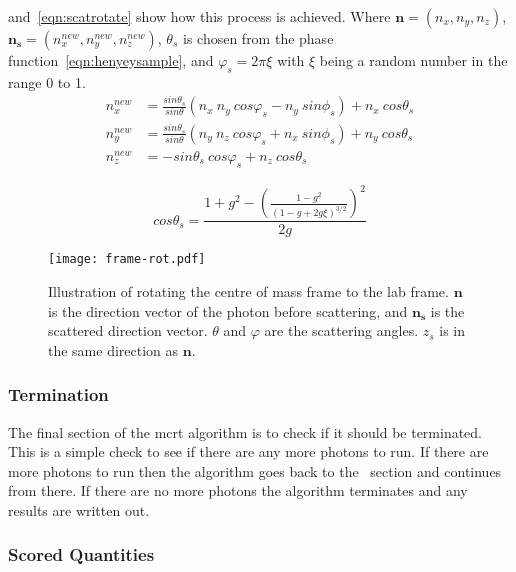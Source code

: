 \medskip

 and~\cref{eqn:scatrotate} show how this process is achieved.
Where $\mathbf{n}=(n_x,n_y,n_z)$, $\mathbf{n_s}=(n_{x}^{new},n_{y}^{new},n_{z}^{new})$, $\theta_s$ is chosen from the phase function~\cref{eqn:henyeysample}, and $\varphi_s=2\pi \xi$ with $\xi$ being a random number in the range 0 to 1.
\begin{equation}
	\begin{aligned}
		n_{x}^{new} &= \frac{sin\theta_s}{sin\theta} \left(n_x\ n_y\ cos\varphi_s - n_y\ sin\phi_s\right) + n_x\ cos\theta_s \\
		n_{y}^{new} &= \frac{sin\theta_s}{sin\theta} \left(n_y\ n_z\ cos\varphi_s + n_x\ sin\phi_s\right) + n_y\ cos\theta_s \\
		n_{z}^{new} &= -sin\theta_s\ cos\varphi_s + n_z\ cos\theta_s
	\end{aligned}
	\label{eqn:scatrotate}
\end{equation}

\begin{equation}
cos\theta_s = \frac{1+g^2-\left(\frac{1-g^2}{(1-g+2g\xi)^{3/2}}\right)^2}{2g}
\label{eqn:henyeysample}
\end{equation}


\begin{figure}[!ht]
	\centering
	\texttt{[image: frame-rot.pdf]}
	\caption{Illustration of rotating the centre of mass frame to the lab frame. $\mathbf{n}$ is the direction vector of the photon before scattering, and $\mathbf{n_s}$ is the scattered direction vector. $\theta$ and $\varphi$ are the scattering angles. $z_s$ is in the same direction as $\mathbf{n}$.}
	\label{fig:labframerotate}
\end{figure}


\subsubsection*{Termination}\label{sec:terminator}

The final section of the \gls*{mcrt} algorithm is to check if it should be terminated. This is a simple check to see if there are any more photons to run.
If there are more photons to run then the algorithm goes back to the~ section and continues from there.
If there are no more photons the algorithm terminates and any results are written out.


\subsubsection*{Scored Quantities}\label{sec:fluencecalc}

